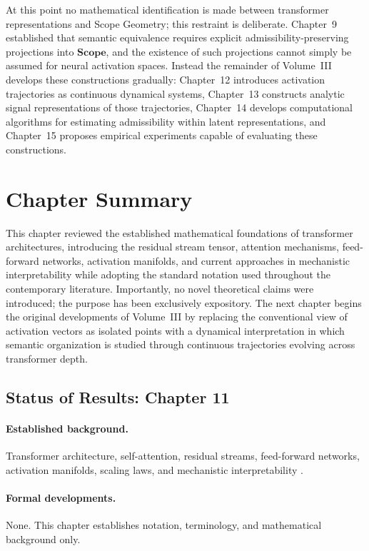 \documentclass[11pt,twoside,openright]{book}
\numberwithin{equation}{chapter}
\theoremstyle{definition}
\theoremstyle{plain}
\theoremstyle{remark}
\theoremstyle{definition}
\newcommand{\CatScope}{\mathbf{Scope}}
\begin{document}
At this point no mathematical identification is made between transformer
representations and Scope Geometry; this restraint is deliberate.
Chapter~9 established that semantic equivalence requires explicit
admissibility-preserving projections into $\CatScope$, and the existence
of such projections cannot simply be assumed for neural activation
spaces. Instead the remainder of Volume~III develops these constructions
gradually: Chapter~12 introduces activation trajectories as continuous
dynamical systems, Chapter~13 constructs analytic signal representations
of those trajectories, Chapter~14 develops computational algorithms for
estimating admissibility within latent representations, and Chapter~15
proposes empirical experiments capable of evaluating these constructions.

\section{Chapter Summary}

This chapter reviewed the established mathematical foundations of
transformer architectures, introducing the residual stream tensor,
attention mechanisms, feed-forward networks, activation manifolds, and
current approaches in mechanistic interpretability while adopting the
standard notation used throughout the contemporary literature.
Importantly, no novel theoretical claims were introduced; the purpose has
been exclusively expository. The next chapter begins the original
developments of Volume~III by replacing the conventional view of
activation vectors as isolated points with a dynamical interpretation in
which semantic organization is studied through continuous trajectories
evolving across transformer depth.

\subsection*{Status of Results: Chapter 11}

\paragraph{Established background.} Transformer architecture,
self-attention, residual streams, feed-forward networks, activation
manifolds, scaling laws, and mechanistic interpretability
\cite{Vaswani2017,Kaplan2020,Hoffmann2022,Elhage2021,Olah2020,Nanda2023}.

\paragraph{Formal developments.} None. This chapter establishes notation,
terminology, and mathematical background only.
\end{document}
